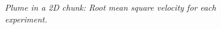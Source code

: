 \begin{figure}
  \centering
  
  \caption{\it Plume in a 2D chunk: Root mean square velocity for each experiment.}
  \label{fig:plume-diff-creep-vrms}
\end{figure}

